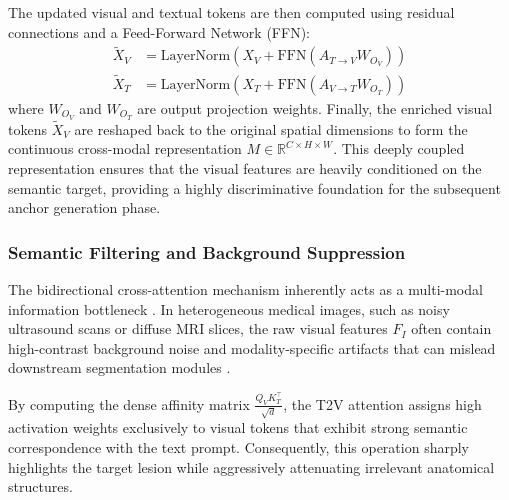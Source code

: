 \documentclass[onecolumn]{IEEEtran}
\numberwithin{equation}{section}
\theoremstyle{definition}
\theoremstyle{remark}
\begin{document}
The updated visual and textual tokens are then computed using residual connections and a Feed-Forward Network (FFN):
\begin{align}
    \tilde{X}_V &= \text{LayerNorm}(X_V + \text{FFN}(A_{T \to V} W_{O_V})) \\
    \tilde{X}_T &= \text{LayerNorm}(X_T + \text{FFN}(A_{V \to T} W_{O_T}))
\end{align}
where $W_{O_V}$ and $W_{O_T}$ are output projection weights. Finally, the enriched visual tokens $\tilde{X}_V$ are reshaped back to the original spatial dimensions to form the continuous cross-modal representation $M \in \mathbb{R}^{C \times H \times W}$. This deeply coupled representation ensures that the visual features are heavily conditioned on the semantic target, providing a highly discriminative foundation for the subsequent anchor generation phase.

\subsubsection{Semantic Filtering and Background Suppression}
The bidirectional cross-attention mechanism inherently acts as a multi-modal information bottleneck \cite{wang2023visual}. In heterogeneous medical images, such as noisy ultrasound scans or diffuse MRI slices, the raw visual features $F_I$ often contain high-contrast background noise and modality-specific artifacts that can mislead downstream segmentation modules \cite{lan2024proxyclip}. 

By computing the dense affinity matrix $\frac{Q_V K_T^\top}{\sqrt{d}}$, the T2V attention assigns high activation weights exclusively to visual tokens that exhibit strong semantic correspondence with the text prompt. Consequently, this operation sharply highlights the target lesion while aggressively attenuating irrelevant anatomical structures. 
\end{document}
